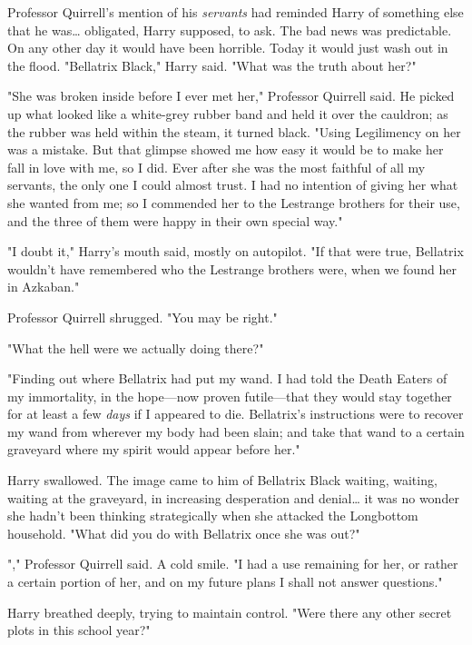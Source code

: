 Professor Quirrell's mention of his \emph{servants} had reminded Harry of 
something else that he was{\ldots} obligated, Harry supposed, to ask. The bad 
news was predictable. On any other day it would have been horrible. Today it 
would just wash out in the flood. "Bellatrix Black," Harry said. "What was the 
truth about her?"

"She was broken inside before I ever met her," Professor Quirrell said. He 
picked up what looked like a white-grey rubber band and held it over the 
cauldron; as the rubber was held within the steam, it turned black. "Using 
Legilimency on her was a mistake. But that glimpse showed me how easy it would 
be to make her fall in love with me, so I did. Ever after she was the most 
faithful of all my servants, the only one I could almost trust. I had no 
intention of giving her what she wanted from me; so I commended her to the 
Lestrange brothers for their use, and the three of them were happy in their own 
special way."

"I doubt it," Harry's mouth said, mostly on autopilot. "If that were true, 
Bellatrix wouldn't have remembered who the Lestrange brothers were, when we 
found her in Azkaban."

Professor Quirrell shrugged. "You may be right."

"What the hell were we actually doing there?"

"Finding out where Bellatrix had put my wand. I had told the Death Eaters of my 
immortality, in the hope---now proven futile---that they would stay together 
for at least a few \emph{days} if I appeared to die. Bellatrix's instructions 
were to recover my wand from wherever my body had been slain; and take that 
wand to a certain graveyard where my spirit would appear before her."

Harry swallowed. The image came to him of Bellatrix Black waiting, waiting, 
waiting at the graveyard, in increasing desperation and denial{\ldots} it was 
no wonder she hadn't been thinking strategically when she attacked the 
Longbottom household. "What did you do with Bellatrix once she was out?"

"," Professor Quirrell 
said. A cold smile. "I had a use remaining for her, or rather a certain portion 
of her, and on my future plans I shall not answer questions."

Harry breathed deeply, trying to maintain control. "Were there any other secret 
plots in this school year?"

